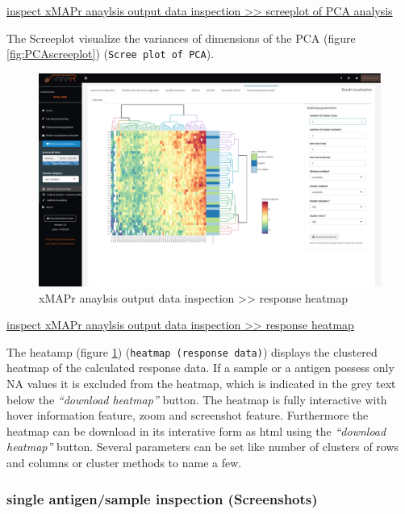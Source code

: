 \documentclass[
]{book}
\begin{document}
\href{figures/global_result_overview_PCA_scree.png}{inspect xMAPr anaylsis output data inspection \textgreater\textgreater{} screeplot of PCA analysis}

The Screeplot visualize the variances of dimensions of the PCA (figure \ref{fig:PCAscreeplot}) (\texttt{Scree\ plot\ of\ PCA}).

\begin{figure}
\includegraphics[width=50.47in]{figures/response_heatmap} \caption{xMAPr anaylsis output data inspection >> response heatmap}\label{fig:responseHeatmap}
\end{figure}

\href{figures/response_heatmap.png}{inspect xMAPr anaylsis output data inspection \textgreater\textgreater{} response heatmap}

The heatamp (figure \ref{fig:responseHeatmap}) (\texttt{heatmap\ (response\ data)}) displays the clustered heatmap of the calculated response data. If a sample or a antigen possess only NA values it is excluded from the heatmap, which is indicated in the grey text below the \emph{``download heatmap''} button. The heatmap is fully interactive with hover information feature, zoom and screenshot feature. Furthermore the heatmap can be download in its interative form as html using the \emph{``download heatmap''} button. Several parameters can be set like number of clusters of rows and columns or cluster methods to name a few.

\hypertarget{single-antigensample-inspection-screenshots}{%
\subsubsection{single antigen/sample inspection (Screenshots)}\label{single-antigensample-inspection-screenshots}}
\end{document}
